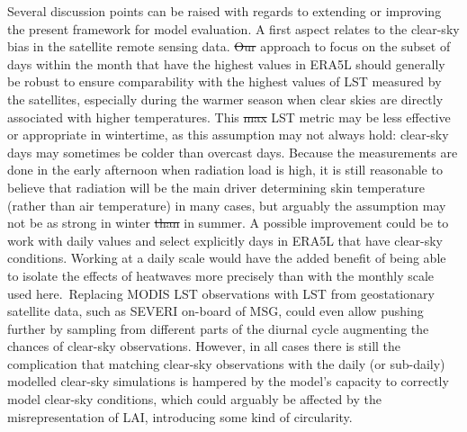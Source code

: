 \documentclass[gmd, manuscript]{copernicus}
\providecommand{\DIFadd}[1]{{\protect\color{blue}\uwave{#1}}} %
\providecommand{\DIFdel}[1]{{\protect\color{red}\sout{#1}}}                      %
\providecommand{\DIFaddbegin}{} %
\providecommand{\DIFaddend}{} %
\providecommand{\DIFdelbegin}{} %
\providecommand{\DIFdelend}{} %
\begin{document}
{Several discussion points can be raised with regards to extending or
improving the present framework for model evaluation. A first aspect
relates to the clear-sky bias in the satellite remote sensing data. \DIFdelbegin \DIFdel{Our
}\DIFdelend \DIFaddbegin \DIFadd{As 
mentioned before, our }\DIFaddend approach to focus on the subset of days within the 
month that have the highest values in ERA5L should generally be robust to ensure
comparability with the highest values of LST measured by the satellites,
especially during the warmer season when clear skies are directly
associated with higher temperatures. This \DIFdelbegin \DIFdel{max }\DIFdelend \DIFaddbegin \DIFadd{maximum }\DIFaddend LST metric may be less
effective or appropriate in wintertime, as this assumption may not
always hold: clear-sky days may sometimes be colder than overcast days.
Because the measurements are done in the early afternoon when radiation
load is high, it is still reasonable to believe that radiation will be
the main driver determining skin temperature (rather than air
temperature) in many cases, but arguably the assumption may not be as
strong in winter \DIFdelbegin \DIFdel{than }\DIFdelend \DIFaddbegin \DIFadd{as }\DIFaddend in summer. A possible improvement could be to work
with daily values and select explicitly days in ERA5L that have
clear-sky conditions. Working at a daily scale would have the added
benefit of being able to isolate the effects of heatwaves more precisely
than with the monthly scale used here.~Replacing MODIS LST observations
with LST from geostationary satellite data, such as SEVERI on-board of
MSG, could even allow pushing further by sampling from different parts
of the diurnal cycle augmenting the chances of clear-sky observations.
However, in all cases there is still the complication that matching
clear-sky observations with the daily (or sub-daily) modelled clear-sky
simulations is hampered by the model's capacity to correctly model
clear-sky conditions, which could arguably be affected by the
misrepresentation of LAI, introducing some kind of circularity.

}
\end{document}
